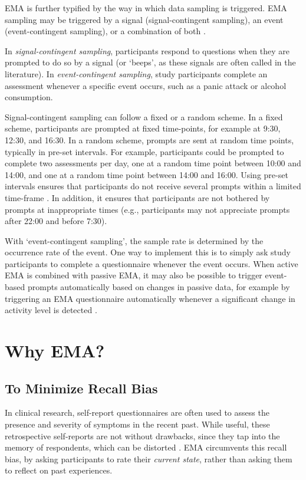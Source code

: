 \documentclass[]{book}
\begin{document}
EMA is further typified by the way in which data sampling is triggered.
EMA sampling may be triggered by a signal (signal-contingent sampling),
an event (event-contingent sampling), or a combination of both
\citep{Conner2012b}.

In \emph{signal-contingent sampling}, participants respond to questions
when they are prompted to do so by a signal (or `beeps', as these
signals are often called in the literature). In \emph{event-contingent
sampling}, study participants complete an assessment whenever a specific
event occurs, such as a panic attack or alcohol consumption.

Signal-contingent sampling can follow a fixed or a random scheme. In a
fixed scheme, participants are prompted at fixed time-points, for
example at 9:30, 12:30, and 16:30. In a random scheme, prompts are sent
at random time points, typically in pre-set intervals. For example,
participants could be prompted to complete two assessments per day, one
at a random time point between 10:00 and 14:00, and one at a random time
point between 14:00 and 16:00. Using pre-set intervals ensures that
participants do not receive several prompts within a limited time-frame
\citep{Piasecki2007}. In addition, it ensures that participants are not
bothered by prompts at inappropriate times (e.g., participants may not
appreciate prompts after 22:00 and before 7:30).

With `event-contingent sampling', the sample rate is determined by the
occurrence rate of the event. One way to implement this is to simply ask
study participants to complete a questionnaire whenever the event
occurs. When active EMA is combined with passive EMA, it may also be
possible to trigger event-based prompts automatically based on changes
in passive data, for example by triggering an EMA questionnaire
automatically whenever a significant change in activity level is
detected \citep{Smyth2003}.

\section{Why EMA?}\label{why-ema}

\subsection{To Minimize Recall Bias}\label{to-minimize-recall-bias}


In clinical research, self-report questionnaires are often used to
assess the presence and severity of symptoms in the recent past. While
useful, these retrospective self-reports are not without drawbacks,
since they tap into the memory of respondents, which can be distorted
\citep{Shiffman2008, Moore2016}. EMA circumvents this recall bias, by
asking participants to rate their \emph{current state}, rather than
asking them to reflect on past experiences.
\end{document}
